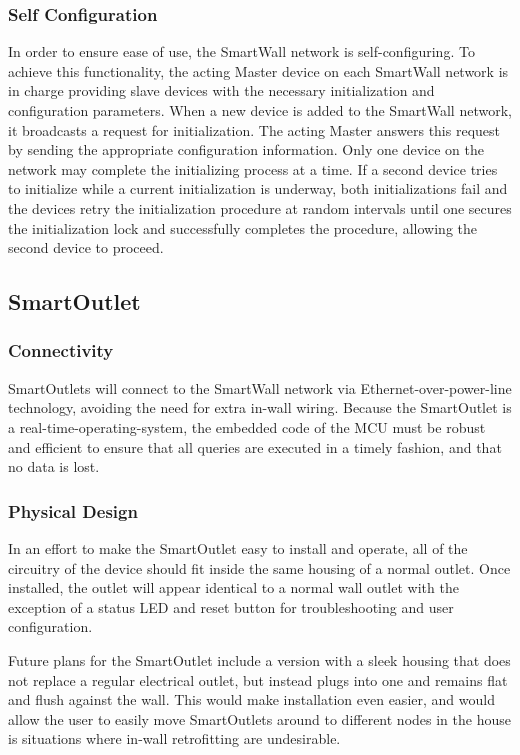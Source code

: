 \documentclass[12pt]{article}
\begin{document}
\subsubsection{Self Configuration}
\label{sec:Design.SmartWallProtocol.SelfConfiguration}
In order to ensure ease of use, the SmartWall network is
self-configuring. To achieve this functionality, the acting Master device
on each SmartWall network is in charge providing slave devices with
the necessary
initialization and configuration parameters. When a new device is
added to the SmartWall network, it broadcasts a request for
initialization. The acting Master answers this request by sending the
appropriate configuration information. Only one device on the network
may complete the initializing process at a time. If a second device
tries to initialize while a current initialization is underway, both
initializations fail and the devices retry the initialization
procedure at random
intervals until one secures the initialization lock and successfully
completes the procedure, allowing the second device to proceed.

\subsection{SmartOutlet}
\subsubsection{Connectivity}
SmartOutlets will connect to the SmartWall network via
Ethernet-over-power-line technology, avoiding the need for extra
in-wall wiring.  Because the SmartOutlet is a
real-time-operating-system, the embedded code of the MCU must be
robust and efficient to ensure that all queries are executed in a
timely fashion, and that no data is lost.

\subsubsection{Physical Design}
In an effort to make the SmartOutlet easy to install and operate, all
of the circuitry of the device should fit inside the same
housing of a normal outlet. Once installed, the outlet will appear
identical to a normal wall outlet with the exception of a status LED
and reset button for troubleshooting and user configuration.

Future plans for the
SmartOutlet include a version with a sleek housing that does not
replace a regular electrical outlet, but instead plugs into one and
remains flat and flush against the wall.  This would make installation
even easier, and would allow the user to easily move SmartOutlets
around to different nodes in the house is situations where in-wall
retrofitting are undesirable.
\end{document}

